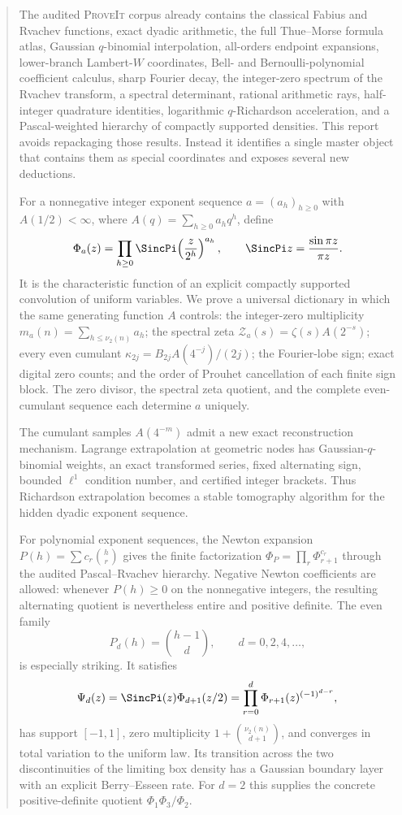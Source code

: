 \documentclass[11pt,oneside]{article}
\numberwithin{equation}{section}
\theoremstyle{definition}
\theoremstyle{remark}
\newcommand{\repo}{\textsc{ProveIt}}
\begin{document}
\begin{abstract}
The audited \repo{} corpus already contains the classical Fabius and Rvachev functions,
exact dyadic arithmetic, the full Thue--Morse formula atlas, Gaussian $q$-binomial
interpolation, all-orders endpoint expansions, lower-branch Lambert-$W$ coordinates,
Bell- and Bernoulli-polynomial coefficient calculus, sharp Fourier decay, the integer-zero
spectrum of the Rvachev transform, a spectral determinant, rational arithmetic rays,
half-integer quadrature identities, logarithmic $q$-Richardson acceleration, and a
Pascal-weighted hierarchy of compactly supported densities.  This report avoids repackaging
those results.  Instead it identifies a single master object that contains them as special
coordinates and exposes several new deductions.

For a nonnegative integer exponent sequence $a=(a_h)_{h\ge0}$ with
$A(1/2)<\infty$, where $A(q)=\sum_{h\ge0}a_hq^h$, define
\[
 \Phi_a(z)=\prod_{h\ge0}\SincPi\!\left(\frac{z}{2^h}\right)^{a_h},
 \qquad \SincPi z=\frac{\sin\pi z}{\pi z}.
\]
It is the characteristic function of an explicit compactly supported convolution of
uniform variables.  We prove a universal dictionary in which the same generating function
$A$ controls: the integer-zero multiplicity
$m_a(n)=\sum_{h\le\nu_2(n)}a_h$; the spectral zeta
$\mathcal Z_a(s)=\zeta(s)A(2^{-s})$; every even cumulant
$\kappa_{2j}=B_{2j}A(4^{-j})/(2j)$; the Fourier-lobe sign; exact digital zero counts;
and the order of Prouhet cancellation of each finite sign block.  The zero divisor, the
spectral zeta quotient, and the complete even-cumulant sequence each determine $a$ uniquely.

The cumulant samples $A(4^{-m})$ admit a new exact reconstruction mechanism.  Lagrange
extrapolation at geometric nodes has Gaussian-$q$-binomial weights, an exact transformed
series, fixed alternating sign, bounded $\ell^1$ condition number, and certified integer
brackets.  Thus Richardson extrapolation becomes a stable tomography algorithm for the
hidden dyadic exponent sequence.

For polynomial exponent sequences, the Newton expansion
$P(h)=\sum c_r\binom hr$ gives the finite factorization
$\Phi_P=\prod_r\Phi_{r+1}^{c_r}$ through the audited Pascal--Rvachev hierarchy.  Negative
Newton coefficients are allowed: whenever $P(h)\ge0$ on the nonnegative integers, the
resulting alternating quotient is nevertheless entire and positive definite.  The even
family
\[
 P_d(h)=\binom{h-1}{d},\qquad d=0,2,4,\ldots,
\]
is especially striking.  It satisfies
\[
 \Psi_d(z)=\SincPi(z)\Phi_{d+1}(z/2)
 =\prod_{r=0}^d\Phi_{r+1}(z)^{(-1)^{d-r}},
\]
has support $[-1,1]$, zero multiplicity
$1+\binom{\nu_2(n)}{d+1}$, and converges in total variation to the uniform law.  Its
transition across the two discontinuities of the limiting box density has a Gaussian
boundary layer with an explicit Berry--Esseen rate.  For $d=2$ this supplies the concrete
positive-definite quotient $\Phi_1\Phi_3/\Phi_2$.


\end{abstract}
\end{document}
